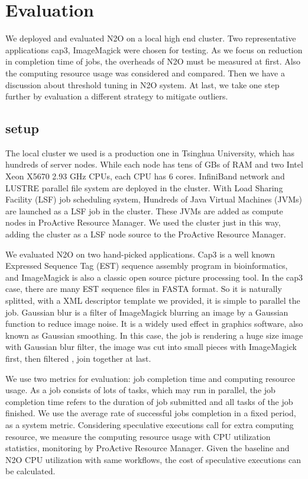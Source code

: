 \section{Evaluation}
We deployed and evaluated N2O on a local high end cluster. Two representative applications cap3, ImageMagick were chosen for testing. As we focus on reduction in completion time of jobs, the overheads of N2O must be measured at first. Also the computing resource usage was considered and compared. Then we have a discussion about threshold tuning in N2O system. At last, we take one step further by evaluation a different strategy to mitigate outliers.

\subsection{setup}

The local cluster we used is a production one in Tsinghua University, which has hundreds of  server nodes. While each node has tens of GBs of RAM and two Intel Xeon X5670 2.93 GHz CPUs, each CPU has 6 cores. InfiniBand network and LUSTRE parallel file system are deployed in the cluster. With Load Sharing Facility (LSF) job scheduling system, Hundreds of Java Virtual Machines (JVMs) are launched as a LSF job in the cluster. These JVMs are added as compute nodes in ProActive Resource Manager. We used the cluster just in this way, adding the cluster as a LSF node source to the ProActive Resource Manager.

We evaluated N2O on two hand-picked applications. Cap3 is a well known Expressed Sequence Tag (EST) sequence assembly program in bioinformatics, and ImageMagick is also a classic open source picture processing tool. In the cap3 case, there are many EST sequence files in FASTA format. So it is naturally splitted, with a XML descriptor template we provided, it is simple to parallel the job. Gaussian blur is a filter of ImageMagick blurring an image by a Gaussian function to reduce image noise. It is a widely used effect in graphics software, also known as Gaussian smoothing. In this case, the job is rendering a huge size image with Gaussian blur filter, the image was cut into small pieces with ImageMagick first, then filtered , join together at last. 

We use two metrics for evaluation: job completion time and computing resource usage. As a job consists of lots of tasks, which may run in parallel, the job completion time refers to the duration of job submitted and all tasks of the job finished. We use the average rate of successful jobs completion in a fixed period, as a system metric. Considering speculative executions call for extra computing resource, we measure the computing resource usage with CPU utilization statistics, monitoring by ProActive Resource Manager. Given the baseline and N2O CPU utilization with same workflows, the cost of speculative executions can be calculated.

